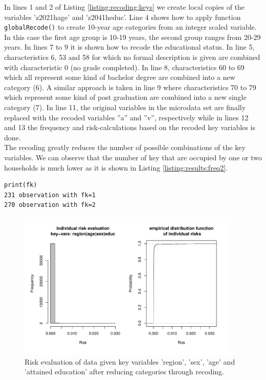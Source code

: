 \documentclass[12pt]{article}
\begin{document}
In lines 1 and 2 of Listing \ref{listing:recoding:keys} we create local copies of the variables 'z2021\textunderscore h\textunderscore age' and 'z2041\textunderscore h\textunderscore educ'. Line 4 shows how to apply function \lstinline{globalRecode()} to create 10-year age categories from an integer scaled variable. In this case the first age group is 10-19 years, the second group ranges from 20-29 years. In lines 7 to 9 it is shown how to recode the educational status. In line 5, characteristics 6, 53 and 58 for which no formal description is given are combined with characteristic 0 (no grade completed). In line 8, characteristics 60 to 69 which all represent some kind of bachelor degree are combined into a new category (6). A similar approach is taken in line 9 where characteristics 70 to 79 which represent some kind of post graduation are combined into a new single category (7). In line 11, the original variables in the microdata set are finally replaced with the recoded variables ''a'' and ''v'', respectively while in lines 12 and 13 the frequency and risk-calculations based on the recoded key variables is done.\\

The recoding greatly reduces the number of possible combinations of the key variables. 
We can observe that the number of key that are occupied by one or two households is much lower as it is shown in Listing \ref{listing:results:freq2}.  \\  

\begin{lstlisting}[numbers=none,captionpos=b, caption={Results of frequency calculation after recoding}, label=listing:results:freq2]
print(fk)
231 observation with fk=1 
270 observation with fk=2 
\end{lstlisting}

\begin{figure}
	\centering
	\includegraphics[width=0.95\textwidth]{risk2}
	\caption{Risk evaluation of data given key variables 'region', 'sex', 'age' and 'attained education' after reducing categories through recoding.}
	\label{graph:risk2}
\end{figure}
\end{document}
